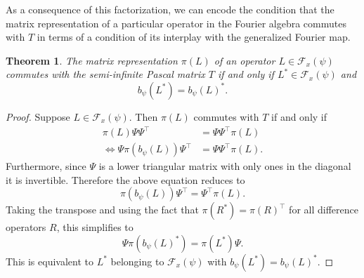\documentclass[11pt]{amsart}
\theoremstyle{plain}
\newtheorem{theorem}{Theorem}[section]
\newcommand \bth[1] { \begin{theorem}\label{t#1} }
\renewcommand {\eth} { \end{theorem} }
\theoremstyle{named}
\begin{document}
As a consequence of this factorization, we can encode the condition that the matrix representation of a particular operator in the Fourier algebra commutes with $T$ in terms of a condition of its interplay with the generalized Fourier map.
\bth{thm:commuting}
The matrix representation $\pi(L)$ of an operator $L\in \mathcal F_x(\psi)$ commutes with the semi-infinite Pascal matrix $T$ if and only if $L^*\in \mathcal F_x(\psi)$ and
$$b_\psi(L^*) = b_\psi(L)^*.$$
\eth
\begin{proof}
Suppose $L\in\mathcal F_x(\psi)$.
Then $\pi(L)$ commutes with $T$ if and only if
\begin{align*}
\pi(L)\Psi\Psi^\intercal&=\Psi\Psi^\intercal\pi(L)\\
\Leftrightarrow\Psi\pi(b_\psi(L))\Psi^\intercal&=\Psi\Psi^\intercal\pi(L).    
\end{align*}
Furthermore, since $\Psi$ is a lower triangular matrix with only ones in the diagonal it is invertible.
Therefore the above equation reduces to
$$\pi(b_\psi(L))\Psi^\intercal=\Psi^\intercal\pi(L).$$
Taking the transpose and using the fact that $\pi(R^*) = \pi(R)^\intercal$ for all difference operators $R$, this simplifies to
$$\Psi\pi(b_\psi(L)^*)=\pi(L^*)\Psi.$$
This is equivalent to $L^*$ belonging to $\mathcal F_x(\psi)$ with $b_\psi(L^*) = b_\psi(L)^*$.
\end{proof}
\end{document}
